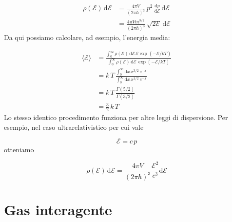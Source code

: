 \documentclass[a4paper]{report}
\newcommand\ddfrac[2]{\frac{\displaystyle #1}{\displaystyle #2}}
\begin{document}
\begin{equation}
\begin{split}
    \rho(\mathcal{E}) \,\mathrm{d}\mathcal{E} & = \frac{4\pi V}{(2\pi\hbar)^3}\,p^2\,\frac{\mathrm{d}p}{\mathrm{d\mathcal{E}}}\,\mathrm{d}\mathcal{E}\\
    & = \frac{4\pi V m^{3/2}}{(2\pi\hbar)^3}\,\sqrt{2\mathcal{E}}\,\mathrm{d}\mathcal{E}
\end{split}
\end{equation}
Da qui possiamo calcolare, ad esempio, l'energia media:

\begin{equation}
\begin{split}
      \langle \mathcal{E} \rangle & = \ddfrac{\int_0^\infty \rho(\mathcal{E})\, \mathrm{d}\mathcal{E}\,\mathcal{E}\exp(-\mathcal{E}/kT)}{\int_0^\infty \rho(\mathcal{E})\, \mathrm{d}\mathcal{E}\,\exp(-\mathcal{E}/kT)} \\
      & = k\, T\, \ddfrac{\int_0^{\infty}\mathrm{d}x \, x^{3/2}\, e^{-x}}{\int_0^{\infty}\mathrm{d}x \, x^{1/2}\, e^{-x}} \\
      & = k\,T\,\frac{\Gamma(5/2)}{\Gamma(3/2)} \\
      & = \frac{3}{2}\,k\,T
\end{split}
\end{equation}
Lo stesso identico procedimento funziona per altre leggi di dispersione. Per esempio, nel caso ultrarelativistico per cui vale

\begin{equation}
    \mathcal{E} = c\,p
\end{equation}
otteniamo

\begin{equation}
    \rho(\mathcal{E})\,\mathrm{d}\mathcal{E} = \frac{4\pi V}{(2\pi\hbar)^3} \frac{\mathcal{E}^2}{c^3}\mathrm{d}\mathcal{E}
\end{equation}

\section{Gas interagente}
\end{document}
